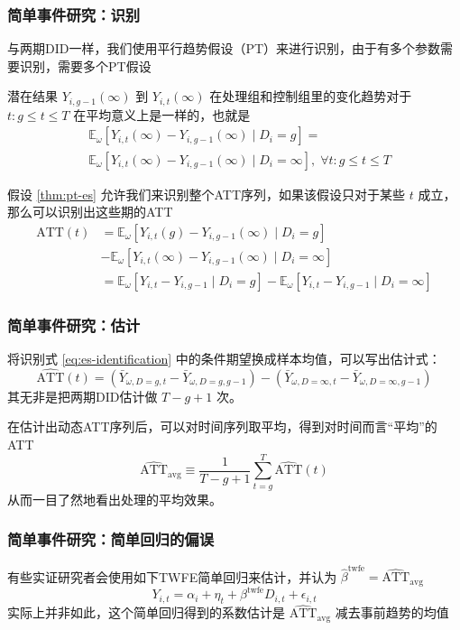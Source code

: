 \documentclass[../didNotes.tex]{subfiles}
\begin{document}
\begin{frame}
  \frametitle{简单事件研究：识别}

  与两期DID一样，我们使用平行趋势假设（PT）来进行识别，由于有多个参数需要识别，需要多个PT假设
  \begin{assumption}[PT-ES]\label{thm:pt-es}
    潜在结果 $Y_{i,g-1}(\infty)$ 到 $Y_{i,t}(\infty)$ 在处理组和控制组里的变化趋势对于 $t:g\le t\le T$ 在平均意义上是一样的，也就是
    \begin{align*}
      &\mathbb{E}_{\omega}[Y_{i,t}(\infty) -Y_{i,g-1}(\infty) \mid D_i=g] = \\
      &\mathbb{E}_{\omega}[Y_{i,t}(\infty) - Y_{i,g-1}(\infty) \mid D_i=\infty], \; \forall t: g \le t \le T
    \end{align*}
  \end{assumption}
  假设 \ref{thm:pt-es} 允许我们来识别整个ATT序列，如果该假设只对于某些 $t$ 成立，那么可以识别出这些期的ATT
  \begin{align}
    \text{ATT}(t) & = \mathbb{E}_{\omega}[Y_{i,t}(g)-Y_{i,g-1}(\infty) \mid D_{i}=g] \nonumber \\
    & -\mathbb{E}_{\omega}[Y_{i,t}(\infty)-Y_{i,g-1}(\infty) \mid D_{i}=\infty] \nonumber \\
    & = \mathbb{E}_{\omega}[Y_{i,t}-Y_{i,g-1} \mid D_{i}=g] -
    \mathbb{E}_{\omega}[Y_{i,t}-Y_{i,g-1} \mid D_{i}=\infty] \label{eq:es-identification}
  \end{align}
\end{frame}

\begin{frame}
  \frametitle{简单事件研究：估计}

  将识别式 \eqref{eq:es-identification} 中的条件期望换成样本均值，可以写出估计式：
  $$
  \widehat{\text{ATT}}(t) = (\bar{Y}_{\omega, D=g, t}-\bar{Y}_{\omega, D=g, g-1}) -
  (\bar{Y}_{\omega, D=\infty, t}-\bar{Y}_{\omega, D=\infty, g-1})
  $$
  其无非是把两期DID估计做 $T-g+1$ 次。

  在估计出动态ATT序列后，可以对时间序列取平均，得到对时间而言``平均''的ATT
  $$
  \widehat{\text{ATT}}_{\text{avg}} \equiv \frac{1}{T-g+1} \sum_{t=g}^{T} \widehat{\text{ATT}}(t)
  $$
  从而一目了然地看出处理的平均效果。

\end{frame}

\begin{frame}
  \frametitle{简单事件研究：简单回归的偏误}
  有些实证研究者会使用如下TWFE简单回归来估计，并认为 $\hat{\beta}^{\text{twfe}}=\widehat{\text{ATT}}_{\text{avg}}$
  $$
  Y_{i,t} = \alpha_{i} + \eta_{t} + \beta^{\text{twfe}} D_{i,t} + \epsilon_{i,t}
  $$
  实际上并非如此，这个简单回归得到的系数估计是 $\widehat{\text{ATT}}_{\text{avg}}$ 减去事前趋势的均值

\end{frame}
\end{document}
